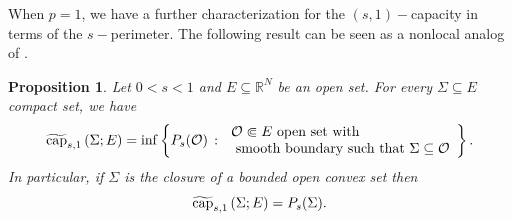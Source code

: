 \documentclass{amsart}
\newtheorem{proposition}[theorem]{Proposition}
\theoremstyle{definition}
\numberwithin{equation}{section}
\begin{document}
When $p=1$, we have a further characterization for the $(s, 1)-$capacity in terms of the $s-$perimeter. The following result can be seen as a nonlocal analog of \cite[Lemma 2.2.5]{Maz}.  

\begin{proposition}  \label{prop:cap-per}
	Let $0 < s < 1$ and $E \subseteq \mathbb{R}^N$ be an open set. For every $\Sigma \subseteq E$ compact set, we have 
	\[
	\widetilde{{\rm cap}}_{s,1}\left(\Sigma; E\right) = \inf\left\{P_s(\mathcal{O})\,:\, \begin{array}{ll}
		\mathcal{O} \Subset E \mbox{ open set with  }  \\ \mbox{ smooth boundary such that } \Sigma \subseteq \mathcal{O}
	\end{array}\right\}. 
	\]
	In particular, if $\Sigma$ is the closure of a bounded open convex set then 
	\[
	\widetilde{{\rm cap}}_{s,1}\left(\Sigma; E\right) = P_s(\Sigma). 
	\]
\end{proposition}
\end{document}
